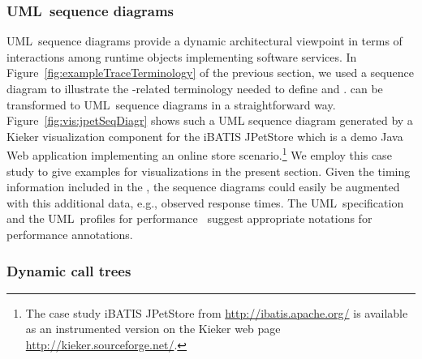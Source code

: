 \subsubsection{UML~sequence diagrams}

UML~sequence diagrams provide a dynamic architectural viewpoint in terms %
of interactions among runtime objects implementing software services. %
In Figure~\ref{fig:exampleTraceTerminology} of the previous section, we used %
a sequence diagram to illustrate the \trace{}-related terminology needed to define %
\executionTraces{} and \messageTraces{}. %
\MessageTraces{} can be transformed to UML~sequence diagrams in a straightforward way. %
Figure~\ref{fig:vis:jpetSeqDiagr} shows such a UML sequence diagram generated by %
a Kieker visualization component for the iBATIS JPetStore which is a demo Java Web application implementing an
online store scenario.\footnote{The case study iBATIS JPetStore from \url{http://ibatis.apache.org/} is available as an instrumented version on the Kieker web page \url{http://kieker.sourceforge.net/}.} We employ this case study to give examples for visualizations in the present section. %
Given the timing information included in the \executionTraces{}, the sequence diagrams %
could easily be augmented with this additional data, e.g., observed response %
times. The UML~specification~\citep{OMG2007UML22Superstructure} and %
the UML~profiles for performance~\citep{OMG2005UMLProfileForSchedulabilityPerformanceAndTimeV1-1,OMG2008UMLProfileForMARTEBeta2} %
suggest appropriate notations for performance annotations. %

\subsubsection{Dynamic call trees}


